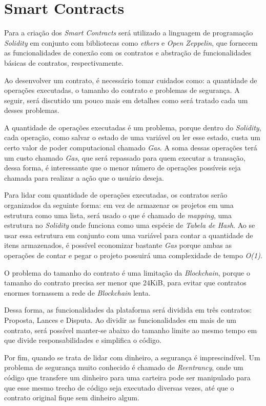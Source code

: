 \section{Smart Contracts}

Para a criação dos \textit{Smart Contracts} será utilizado a linguagem de programação \textit{Solidity} em conjunto com bibliotecas como \textit{ethers} e \textit{Open Zeppelin}, que fornecem as funcionalidades de conexão com os contratos e abstração de funcionalidades básicas de contratos, respectivamente.

Ao desenvolver um contrato, é necessário tomar cuidados como: a quantidade de operações executadas, o tamanho do contrato e problemas de segurança. A seguir, será discutido um pouco mais em detalhes como será tratado cada um desses problemas.

A quantidade de operações executadas é um problema, porque dentro do \textit{Solidity}, cada operação, como salvar o estado de uma variável ou ler esse estado, custa um certo valor de poder computacional chamado \textit{Gas}. A soma dessas operações terá um custo chamado \textit{Gas}, que será repassado para quem executar a transação, dessa forma, é interessante que o menor número de operações possíveis seja chamada para realizar a ação que o usuário deseja.

Para lidar com quantidade de operações executadas, os contratos serão organizados da seguinte forma: em vez de armazenar os projetos em uma estrutura como uma lista, será usado o que é chamado de \textit{mapping}, uma estrutura no \textit{Solidity} onde funciona como uma espécie de \textit{Tabela de Hash}. Ao se usar essa estrutura em conjunto com uma variável para contar a quantidade de itens armazenados, é possível economizar bastante \textit{Gas} porque ambas as operações de contar e pegar o projeto possuirá uma complexidade de tempo \textit{O(1)}.

O problema do tamanho do contrato é uma limitação da \textit{Blockchain}, porque o tamanho do contrato precisa ser menor que 24KiB, para evitar que contratos enormes tornassem a rede de \textit{Blockchain} lenta.

Dessa forma, as funcionalidades da plataforma será dividida em três contratos: Proposta, Lances e Disputa. Ao dividir as funcionalidades em mais de um contrato, será possível manter-se abaixo do tamanho limite ao mesmo tempo em que divide responsabilidades e simplifica o código.

Por fim, quando se trata de lidar com dinheiro, a segurança é imprescindível. Um problema de segurança muito conhecido é chamado de \textit{Reentrancy}, onde um código que transfere um dinheiro para uma carteira pode ser manipulado para que esse mesmo trecho de código seja executado diversas vezes, até que o contrato original fique sem dinheiro algum.

